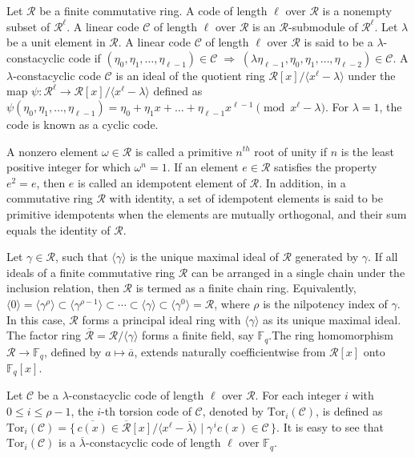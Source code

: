 \documentclass[12pt,a4paper]{article}
\begin{document}
Let $\mathcal{R}$ be a finite commutative ring. A code of length $\ell$ over $\mathcal{R}$ is a nonempty subset of $\mathcal{R}^{\ell}$. A linear code $\mathcal{C}$ of length $\ell$ over $\mathcal{R}$ is an $\mathcal{R}$-submodule of $\mathcal{R}^{\ell}$. Let $\lambda$ be a unit element in $\mathcal{R}$. A linear code $\mathcal{C}$ of length $\ell$ over $\mathcal{R}$ is said to be a $\lambda$-constacyclic code if
$(\eta_0, \eta_1, \dots, \eta_{\ell-1}) \in \mathcal{C}
\;\Rightarrow\;
(\lambda \eta_{\ell-1}, \eta_0, \eta_1, \dots, \eta_{\ell-2}) \in \mathcal{C}$. A $\lambda$-constacyclic code $\mathcal{C}$ is an ideal of the quotient ring $\mathcal{R}[x]/\langle x^{\ell} - \lambda \rangle$ under the map $\psi : \mathcal{R}^{\ell} \to \mathcal{R}[x]/\langle x^{\ell} - \lambda \rangle $ defined as $\psi(\eta_0,\eta_1, \dots, \eta_{\ell-1})=\eta_0+\eta_1x+ \dots+\eta_{\ell-1}x^{\ell-1} \pmod{x^{\ell}-\lambda}$.
For $\lambda=1$, the code is known as a cyclic code.


A nonzero element $\omega \in \mathcal{R}$ is called a primitive $n^{th}$ root of unity if $n$ is the least positive integer for which $\omega^{n} = 1$. If an element $e \in \mathcal{R}$ satisfies the property $e^2=e$, then $e$ is called an idempotent element of $\mathcal{R}$. In addition, in a commutative ring $\mathcal{R}$ with identity, a set of idempotent elements is said to be primitive idempotents when the elements are mutually orthogonal, and their sum equals the identity of $\mathcal{R}$.


Let $\gamma \in \mathcal{R}$, such that $\langle \gamma \rangle$ is the unique maximal ideal of $\mathcal{R}$ generated by $\gamma$. If all ideals of a finite commutative ring $\mathcal{R}$ can be arranged in a single chain under the inclusion relation, then $\mathcal{R}$ is termed as a finite chain ring. Equivalently, $\langle 0 \rangle = \langle \gamma^{\rho} \rangle \subset \langle \gamma^{\rho-1} \rangle \subset \cdots \subset \langle \gamma \rangle \subset \langle \gamma^{0} \rangle = \mathcal{R}$, where $\rho$ is the nilpotency index of $\gamma$. In this case, $\mathcal{R}$ forms a principal ideal ring with $\langle \gamma \rangle$ as its unique maximal ideal. The factor ring $\mathcal{\overline{R}}=\mathcal{R}/\langle \gamma\rangle$ forms a finite field, say $\mathbb{F}_{q}$.The ring homomorphism $\mathcal{R} \to \mathbb{F}_{q}$, defined by $a \mapsto \overline{a}$, extends naturally coefficientwise from $\mathcal{R}[x]$ onto $\mathbb{F}_{q}[x]$. 

\medskip
Let $\mathcal{C}$ be a $\lambda$-constacyclic code of length $\ell$ over $\mathcal{R}$. For each integer $i$ with $0 \le i \le \rho-1$, the $i$-th torsion code of $\mathcal{C}$, denoted by $\mathrm{Tor}_i(\mathcal{C})$, is defined as 
$\mathrm{Tor}_i(\mathcal{C})=\{\,\overline{c(x)}\in \overline{\mathcal{R}}[x]/\langle x^{\ell}- \overline{\lambda} \rangle \mid \gamma^{\,i}c(x) \in \mathcal{C} \,\}$. It is easy to see that $\mathrm{Tor}_i(\mathcal{C})$ is a $\overline{\lambda}$-constacyclic code of length $\ell$ over $\mathbb{F}_q$.
\end{document}
